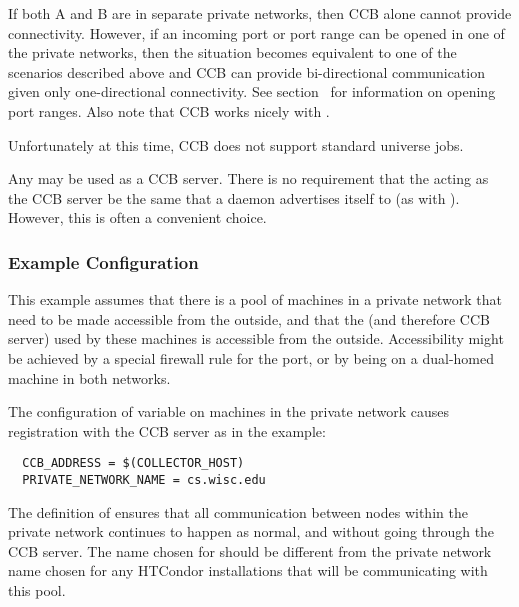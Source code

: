 If both A and B are in separate private networks, then CCB alone
cannot provide connectivity.  However, if an incoming port or port
range can be opened in one of the private networks, then the situation
becomes equivalent to one of the scenarios described above and CCB can
provide bi-directional communication given only one-directional
connectivity.  See section~\label{sec:Port-Details} for information on
opening port ranges.  Also note that CCB works nicely with
.

Unfortunately at this time, CCB does not support standard universe jobs.

Any  may be used as a CCB server.  There is no
requirement that the  acting as the CCB server
be the same  that a daemon
advertises itself to (as with ).
However, this is often a convenient choice.

\subsubsection{Example Configuration}

This example assumes that there is a pool of machines in a private
network that need to be made accessible from the outside,
and that the  (and therefore CCB server)
used by these machines is accessible from the outside.
Accessibility might be achieved by
a special firewall rule for the  port,
or by being on a dual-homed machine in both networks.

The configuration of variable  on
machines in the private network causes registration with
the CCB server as in the example:

\begin{verbatim}
  CCB_ADDRESS = $(COLLECTOR_HOST)
  PRIVATE_NETWORK_NAME = cs.wisc.edu
\end{verbatim}

The definition of  ensures that all
communication between nodes within the private network continues to happen
as normal, and without going through the CCB server.
The name chosen for  should be different
from the private network name chosen for any HTCondor installations that
will be communicating with this pool.

